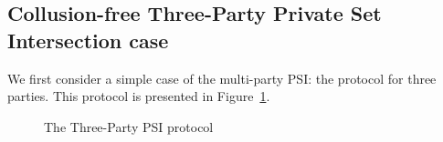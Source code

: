 \subsection{Collusion-free Three-Party Private Set Intersection case}
\label{sect:3psi-construction}
We first consider a simple case of the multi-party PSI: the protocol for three parties. This protocol is presented in Figure~\ref{fig:3psi}. 

\begin{figure}[h]\centering
{}
\caption{The Three-Party PSI protocol}
\label{fig:3psi}
\end{figure}